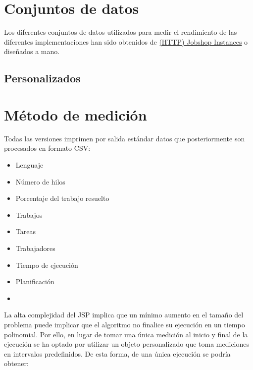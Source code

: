 
\section{Conjuntos de datos}

Los diferentes conjuntos de datos utilizados para medir el rendimiento
de las diferentes implementaciones han sido obtenidos de
\href{http://jobshop.jjvh.nl/}{(HTTP) Jobshop Instances}
o diseñados a mano.

\subsection{}

\subsection{Personalizados}

\section{Método de medición}

Todas las versiones imprimen por salida estándar datos que posteriormente son
procesados en formato CSV:

\begin{itemize}[itemsep=0.25px]
    \item Lenguaje
    \item Número de hilos
    \item Porcentaje del trabajo resuelto
    \item Trabajos
    \item Tareas
    \item Trabajadores
    \item Tiempo de ejecución
    \item Planificación
    \item {}
\end{itemize}

La alta complejidad del JSP implica que un mínimo aumento en el tamaño del problema
puede implicar que el algoritmo no finalice su ejecución en un tiempo polinomial.
Por ello, en lugar de tomar una única medición al inicio y final de la ejecución
se ha optado por utilizar un objeto personalizado que toma mediciones en intervalos
predefinidos.
De esta forma, de una única ejecución se podría obtener:

